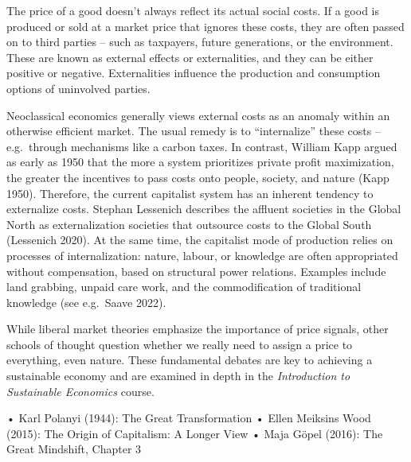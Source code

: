 \documentclass[
  a4paper,
  openany]{book}
\begin{document}
\begin{tcolorbox}[enhanced jigsaw, left=2mm, arc=.35mm, titlerule=0mm, opacityback=0, leftrule=.75mm, title={Internalizing and externalizing}, breakable, bottomtitle=1mm, rightrule=.15mm, coltitle=black, toptitle=1mm, bottomrule=.15mm, colback=white, opacitybacktitle=0.6, colbacktitle=quarto-callout-note-color!10!white, toprule=.15mm, colframe=quarto-callout-note-color-frame]

The price of a good doesn't always reflect its actual social costs. If a
good is produced or sold at a market price that ignores these costs,
they are often passed on to third parties -- such as taxpayers, future
generations, or the environment. These are known as external effects or
externalities, and they can be either positive or negative.
Externalities influence the production and consumption options of
uninvolved parties.

Neoclassical economics generally views external costs as an anomaly
within an otherwise efficient market. The usual remedy is to
``internalize'' these costs -- e.g.~through mechanisms like a carbon
taxes. In contrast, William Kapp argued as early as 1950 that the more a
system prioritizes private profit maximization, the greater the
incentives to pass costs onto people, society, and nature (Kapp 1950).
Therefore, the current capitalist system has an inherent tendency to
externalize costs. Stephan Lessenich describes the affluent societies in
the Global North as externalization societies that outsource costs to
the Global South (Lessenich 2020). At the same time, the capitalist mode
of production relies on processes of internalization: nature, labour, or
knowledge are often appropriated without compensation, based on
structural power relations. Examples include land grabbing, unpaid care
work, and the commodification of traditional knowledge (see e.g.~Saave
2022).

While liberal market theories emphasize the importance of price signals,
other schools of thought question whether we really need to assign a
price to everything, even nature. These fundamental debates are key to
achieving a sustainable economy and are examined in depth in the
\emph{Introduction to Sustainable Economics} course.

\end{tcolorbox}

\begin{tcolorbox}[enhanced jigsaw, left=2mm, arc=.35mm, titlerule=0mm, opacityback=0, leftrule=.75mm, title={Further readings}, breakable, bottomtitle=1mm, rightrule=.15mm, coltitle=black, toptitle=1mm, bottomrule=.15mm, colback=white, opacitybacktitle=0.6, colbacktitle=quarto-callout-note-color!10!white, toprule=.15mm, colframe=quarto-callout-note-color-frame]

• Karl Polanyi (1944): The Great Transformation • Ellen Meiksins Wood
(2015): The Origin of Capitalism: A Longer View • Maja Göpel (2016): The
Great Mindshift, Chapter 3

\end{tcolorbox}
\end{document}
